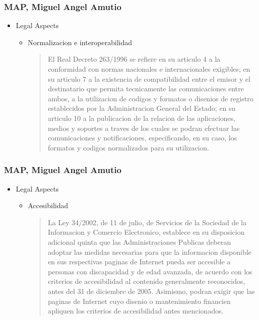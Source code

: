 \documentclass{beamer}
\begin{document}
\begin{frame}
\frametitle{ MAP, Miguel Angel Amutio}

\begin{itemize}
\item Legal Aspects
\begin {itemize}
	\item Normalizacion e interoperabilidad
	\begin{quote} 

El Real Decreto 263/1996 se refiere en su articulo 4 a la conformidad con normas nacionales e internacionales
exigibles; en su articulo 7 a la existencia de compatibilidad entre el emisor y el destinatario que permita
tecnicamente las comunicaciones entre ambos, a la utilizacion de codigos y formatos o disenios de registro
establecidos por la Administracion General del Estado; en su articulo 10 a la publicacion de la relacion de las
aplicaciones, medios y soportes a traves de los cuales se podran efectuar las comunicaciones y notificaciones,
especificando, en su caso, los formatos y codigos normalizados para su utilizacion.

	\end{quote}
\end {itemize}
\end{itemize}

\end{frame}


\begin{frame}
\frametitle{ MAP, Miguel Angel Amutio}

\begin{itemize}
\item Legal Aspects
\begin {itemize}
	\item Accesibilidad
	\begin{quote} 
La Ley 34/2002, de 11 de julio, de Servicios de la Sociedad de la Informacion y Comercio Electronico, establece en su
disposicion adicional quinta que las Administraciones Publicas deberan adoptar las medidas necesarias para que
la informacion disponible en sus respectivas paginas de Internet pueda ser accesible a personas con
discapacidad y de edad avanzada, de acuerdo con los criterios de accesibilidad al contenido generalmente
reconocidos, antes del 31 de diciembre de 2005. Asimismo, podran exigir que las paginas de Internet cuyo
disenio o mantenimiento financien apliquen los criterios de accesibilidad antes mencionados.


	\end{quote}
\end {itemize}
\end{itemize}

\end{frame}
\end{document}
